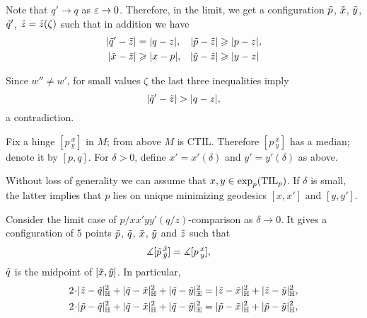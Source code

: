 Note that $q'\to q$ as $\eps\to0$. 
Therefore, in the limit,
we get a configuration $\~p$, $\~x$, $\~y$, $\~q'$, $\~z=\~z(\zeta)$ such that in addition we have
\begin{align*}
|\~q'-\~z|&=|q-z|,
&
|\~p-\~z|&\ge |p-z|,
\\
|\~x-\~z|&\ge |x-p|,
&
|\~y-\~z|&\ge |y-z|
\end{align*}

Since $w''\ne w'$, for small values $\zeta$ the last three inequalities 
imply 
\[|\~q'-\~z|>|q-z|,\]
a contradiction.





Fix a hinge $[p\,^x_y]$ in $M$; from above $M$ is CTIL.
Therefore $[p\,^x_y]$ has a median; denote it by $[p,q]$.
For $\delta>0$, define $x'=x'(\delta)$ and $y'=y'(\delta)$ as above.

\hide
\begin{wrapfigure}{r}{35 mm}
\end{wrapfigure}
\unhide

Without loss of generality we can assume that $x,y\zz\in\exp_p(\TIL_p)$.
If $\delta$ is small, the latter implies that $p$ lies on unique minimizing geodesics $[x,x']$ and $[y,y']$.

Consider the limit case of $p/xx'yy'(q/z)$-comparison  as $\delta\to 0$.
It gives a configuration of 5 points $\~p$, $\~q$, $\~x$, $\~y$ and $\~z$ such that
\begin{align*}
\measuredangle[\~p\,^{\~x}_{\~y}]&=\measuredangle[p\,^x_y],
\end{align*}
$\~q$ is the midpoint of $[\~x, \~y]$.
In particular,
\begin{align*}
2\cdot|\~z-\~q|_\HH^2+|\~q-\~x|_\HH^2+|\~q-\~y|_\HH^2
&=
|\~z-\~x|_\HH^2+|\~z-\~y|_\HH^2,
\\
2\cdot|\~p-\~q|_\HH^2+|\~q-\~x|_\HH^2+|\~q-\~y|_\HH^2
&=
|\~p-\~x|_\HH^2+|\~p-\~y|_\HH^2,
\end{align*}

